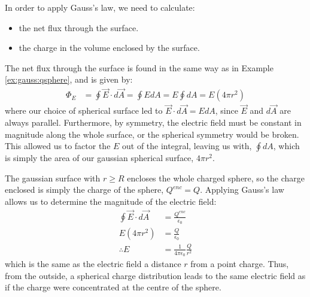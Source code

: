 \begin{example}
In order to apply Gauss's law,  we need to calculate:
\begin{itemize}
\item the net flux through the surface.
\item the charge in the volume enclosed by the surface. 
\end{itemize}
The net flux through the surface is found in the same way as in Example \ref{ex:gauss:qsphere}, and is given by:
\begin{align*}
\Phi_E&=\oint \vec E\cdot d\vec A=\oint E dA= E\oint dA=E(4\pi r^2)
\end{align*}
where our choice of spherical surface led to $\vec E\cdot d\vec A=EdA$, since $\vec E$ and $d\vec A$ are always parallel. Furthermore, by symmetry, the electric field must be constant in magnitude along the whole surface, or the spherical symmetry would be broken. This allowed us to factor the $E$ out of the integral, leaving us with, $\oint dA$, which is simply the area of our gaussian spherical surface, $4\pi r^2$.

The gaussian surface with $r\geq R$ encloses the whole charged sphere, so the charge enclosed is simply the charge of the sphere, $Q^{enc}=Q$. Applying Gauss's law allows us to determine the magnitude of the electric field:
\begin{align*}
\oint \vec E\cdot d\vec A&=\frac{Q^{enc}}{\epsilon_0} \\
E(4\pi r^2) &= \frac{Q}{\epsilon_0}\\
\therefore E&= \frac{1}{4\pi\epsilon_0}\frac{Q}{r^2}
\end{align*}
which is the same as the electric field a distance $r$ from a point charge. Thus, from the outside, a spherical charge distribution leads to the same electric field as if the charge were concentrated at the centre of the sphere.


\end{example}
